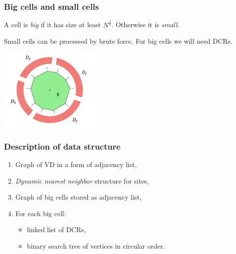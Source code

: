 \begin{frame} \frametitle{Big cells and small cells}
\vspace{2mm}
\begin{definition}
	A cell is \emph{big} if it has size at least $N^{\frac14}$. Otherwise it is \emph{small}.
\end{definition} \medskip

Small cells can be processed by brute force. For big cells we will need DCRs.
    \medskip

\begin{center}
	\includegraphics[width=5cm]{figs/consecDataStr}
\end{center}
\end{frame}

\def\mitem{\medskip\item}
\begin{frame} \frametitle{Description of data structure}
\begin{enumerate}
	\item Graph of VD in a form of adjacency list,
	\mitem {\it Dynamic nearest neighbor} structure for sites,
	\mitem Graph of big cells stored as adjacency list,
	\mitem For each big cell: \begin{itemize}
	     \mitem linked list of DCRs,
	     \mitem binary search tree of vertices in circular order.
	\end{itemize}
\end{enumerate}
\end{frame}

